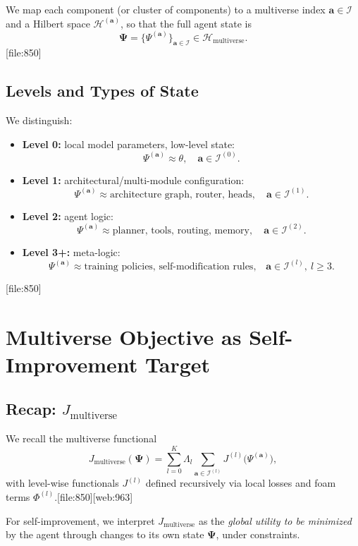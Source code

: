 \documentclass[12pt]{article}
\begin{document}
We map each component (or cluster of components) to a multiverse index
$\bm{a} \in \mathcal{I}$ and a Hilbert space $\mathcal{H}^{(\bm{a})}$, so that
the full agent state is
\[
\bm{\Psi} =
\{ \Psi^{(\bm{a})} \}_{\bm{a} \in \mathcal{I}}
\in
\mathcal{H}_{\text{multiverse}}.
\][file:850]

\subsection{Levels and Types of State}

We distinguish:
\begin{itemize}
  \item \textbf{Level 0:} local model parameters, low-level state:
    \[
    \Psi^{(\bm{a})} \approx \theta,
    \quad \bm{a} \in \mathcal{I}^{(0)}.
    \]
  \item \textbf{Level 1:} architectural/multi-module configuration:
    \[
    \Psi^{(\bm{a})} \approx \text{architecture graph, router, heads},
    \quad \bm{a} \in \mathcal{I}^{(1)}.
    \]
  \item \textbf{Level 2:} agent logic:
    \[
    \Psi^{(\bm{a})} \approx \text{planner, tools, routing, memory},
    \quad \bm{a} \in \mathcal{I}^{(2)}.
    \]
  \item \textbf{Level 3+:} meta-logic:
    \[
    \Psi^{(\bm{a})} \approx \text{training policies, self-modification rules,}
    \quad \bm{a} \in \mathcal{I}^{(l)},\ l \ge 3.
    \]
\end{itemize}[file:850]

\section{Multiverse Objective as Self-Improvement Target}

\subsection{Recap: $J_{\text{multiverse}}$}

We recall the multiverse functional
\[
J_{\text{multiverse}}(\bm{\Psi}) =
\sum_{l=0}^K \Lambda_l
\sum_{\bm{a} \in \mathcal{I}^{(l)}}
J^{(l)}\big(\Psi^{(\bm{a})}\big),
\]
with level-wise functionals $J^{(l)}$ defined recursively via local losses
and foam terms $\Phi^{(l)}$.[file:850][web:963]

For self-improvement, we interpret $J_{\text{multiverse}}$ as the
\emph{global utility to be minimized} by the agent through changes to
its own state $\bm{\Psi}$, under constraints.
\end{document}
